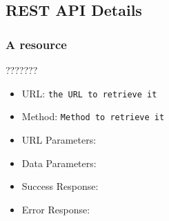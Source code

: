 \subsection{REST API Details}


\subsubsection*{A resource}


???????


\begin{itemize}
    \item URL: \texttt{the URL to retrieve it}
    \item Method: \texttt{Method to retrieve it}
    \item URL Parameters:
    \item Data Parameters: 
    \item Success Response:
    \item Error Response:
    
\end{itemize}

